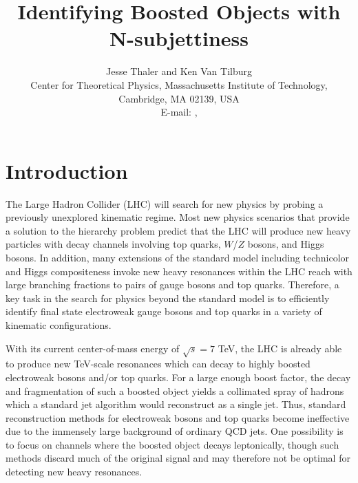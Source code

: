\documentclass{JHEP3}
\title{Identifying Boosted Objects with N-subjettiness}
\author{Jesse Thaler and Ken Van Tilburg \\
Center for Theoretical Physics, Massachusetts Institute of Technology,
Cambridge, MA 02139, USA \vspace{0.05in} \\
E-mail: \email{jthaler@jthaler.net}, \email{kvt@mit.edu}  
}
\begin{document}
\section{Introduction}

The Large Hadron Collider (LHC) will search for new physics by probing a previously unexplored kinematic regime.  Most new physics scenarios that provide a solution to the hierarchy problem predict that the LHC will produce new heavy particles with decay channels involving top quarks, $W$/$Z$ bosons, and Higgs bosons.  In addition, many extensions of the standard model  including technicolor and Higgs compositeness invoke new heavy resonances within the LHC reach with large branching fractions to pairs of gauge bosons and top quarks.  Therefore, a key task in the search for physics beyond the standard model is to efficiently identify final state electroweak gauge bosons and top quarks in a variety of kinematic configurations.

With its current center-of-mass energy of $\sqrt{s} = 7$ TeV, the LHC is already able to produce new TeV-scale resonances which can decay to highly boosted electroweak bosons and/or top quarks.  For a large enough boost factor, the decay and fragmentation of such a boosted object yields a collimated spray of hadrons which a standard jet algorithm would reconstruct as a single jet.  Thus, standard reconstruction methods for electroweak bosons and top quarks become ineffective due to the immensely large background of ordinary QCD jets.  One possibility is to focus on channels where the boosted object decays leptonically, though such methods discard much of the original signal and may therefore not be optimal for detecting new heavy resonances. 
\end{document}
